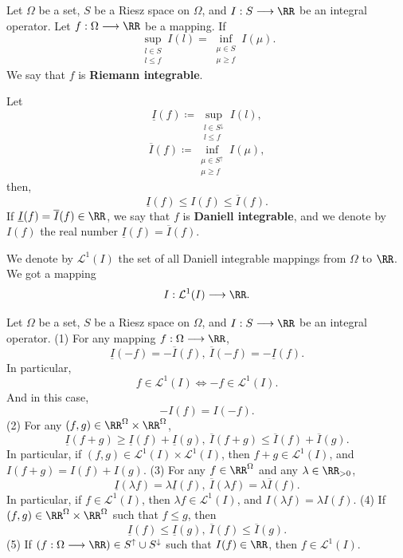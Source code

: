 \begin{definitionenv}
    Let $\Omega$ be a set, $S$ be a Riesz space on $\Omega$, and $I:S\longrightarrow \RR$ be an integral operator. Let $f: \Omega\longrightarrow \RR$ be a mapping. If 
    $$ \sup_{\substack{l\in S\\ l \le f}}I(l)=\inf _{\substack{\mu\in S\\ \mu \ge f}}I(\mu).$$
    We say that $f$ is \textbf{Riemann integrable}.
    
    \quad Let 
    $$\underline{I}(f)\coloneq \sup_{\substack{l\in S^{\downarrow}\\ l\le f}}I(l),$$
    $$ \overline{I}(f)\coloneq \inf_{\substack{\mu\in S^{\uparrow}\\ \mu \ge f}}I(\mu),$$
    then,
    $$ \underline{I}(f)\le I(f)\le \overline{I}(f).$$
    If $ \underline{I}(f)=\overline{I}(f)\in\RR$, we say that $f$ is \textbf{Daniell integrable}, and we denote by $I(f)$ the real number $\underline{I}(f)=\overline{I}(f)$.

    \quad We denote by $\mathcal{L}^{1}(I)$ the set of all Daniell integrable mappings from $\Omega$ to $\RR$. We got a mapping
    $$ I:\mathcal{L}^1 (I)\longrightarrow \RR.$$
\end{definitionenv}
\begin{lemmaenv}
    Let $\Omega$ be a set, $S$ be a Riesz space on $\Omega$, and $I:S\longrightarrow \RR$ be an integral operator.
    \newline
    (1) For any mapping $f:\Omega \longrightarrow \RR$,
    $$ \underline{I}(-f)=-\overline{I}(f),\ \overline{I}(-f)=-\underline{I}(f).$$
    In particular,
    $$ f\in\mathcal{L}^1(I)\Leftrightarrow -f\in\mathcal{L}^1(I).$$
    And in this case, 
    $$ -I(f)=I(-f).$$
    (2) For any $(f,g)\in \RR^\Omega\times \RR^{\Omega}$,
    $$ \underline{I}(f+g)\ge \underline{I}(f)+\underline{I}(g),\ \overline{I}(f+g)\le \overline{I}(f)+\overline{I}(g).$$
    In particular, if $(f,g)\in \mathcal{L}^1(I)\times \mathcal{L}^1(I)$, then $f+g\in \mathcal{L}^1(I)$, and $I(f+g)=I(f)+I(g).$
    \newline
    (3) For any $f\in \RR^{\Omega}$ and any $\lambda\in \RR_{>0}$,
    $$ \underline{I}(\lambda f)=\lambda \underline{I}(f),\ \overline{I}(\lambda f)=\lambda \overline{I}(f).$$
    In particular, if $f\in \mathcal{L}^1(I)$, then $\lambda f \in \mathcal{L}^1(I)$, and $I(\lambda f)=\lambda I(f).$
    \newline
    (4) If $(f,g)\in \RR^{\Omega}\times \RR^{\Omega}$ such that $f\le g$, then 
    $$ \underline{I}(f)\le \underline{I}(g),\ \overline{I}(f)\le \overline{I}(g).$$
    (5) If $(f:\Omega\longrightarrow \RR)\in S^\uparrow\cup S^{\downarrow}$ such that $I(f)\in \RR$, then $f\in \mathcal{L}^1(I)$.

\end{lemmaenv}
